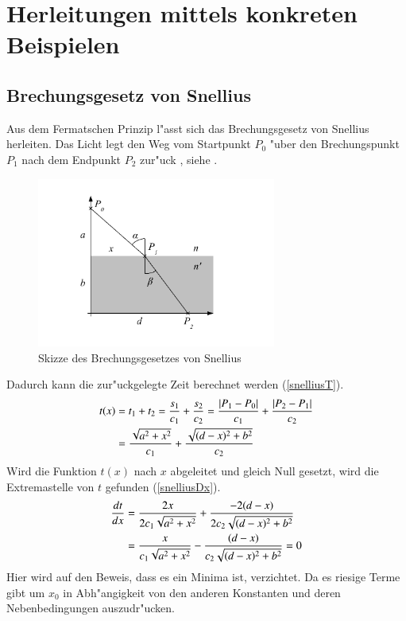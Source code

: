 \section{Herleitungen mittels konkreten Beispielen}
\subsection{Brechungsgesetz von Snellius \label{brechungsgesetz}}
Aus dem Fermatschen Prinzip l"asst sich das Brechungsgesetz von Snellius
herleiten.
Das Licht legt den Weg vom Startpunkt $P_0$ "uber den Brechungspunkt $P_1$ 
nach dem Endpunkt $P_2$ zur"uck \cite{Wikipedia}, siehe  .
\begin{figure}[h]
\begin{center}
	\includegraphics[width=0.7\textwidth]{licht/picture/Brechung.pdf}
	\caption{Skizze des Brechungsgesetzes von Snellius}
	\label{Ab:brechung}
\end{center}
\end{figure}
Dadurch kann die zur"uckgelegte Zeit berechnet werden (\eqref{snelliusT}).
\begin{align}
t(x) &= t_1 + t_2 = \frac{s_1}{c_1} + \frac{s_2}{c_2} = \frac{|P_1 - P_0|}{c_1} + \frac{|P_2 - P_1|}{c_2} \notag \\
&= \frac{\sqrt{a^2 + x^2}}{c_1} + \frac{\sqrt{(d-x)^2 + b^2}}{c_2} \label{snelliusT}
\end{align}
Wird die Funktion $t(x)$ nach $x$ abgeleitet und gleich Null gesetzt, wird die Extremastelle von $t$ gefunden (\eqref{snelliusDx}).
\begin{align}
	\frac{dt}{dx} &= \frac{2 x}{2  c_1  \sqrt{a^2 + x^2}} + \frac{-2  (d-x)}{2  c_2  \sqrt{(d-x)^2 + b^2}} \notag \\
	&= \frac{x}{c_1 \sqrt{a^2 + x^2}} - \frac{(d-x)}{c_2  \sqrt{(d-x)^2 + b^2}} = 0 
	\label{snelliusDx}
\end{align}
Hier wird auf den Beweis, dass es ein Minima ist, verzichtet. Da es riesige Terme gibt um $x_0$ in Abh"angigkeit von den anderen Konstanten und deren Nebenbedingungen auszudr"ucken.
